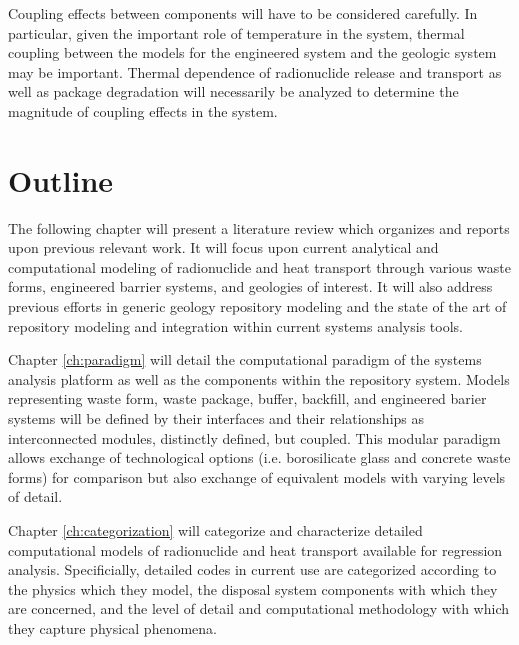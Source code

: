 Coupling effects between components will have to be considered 
carefully.  In particular, given the important role of temperature in 
the system, thermal coupling between the models for the engineered 
system and the geologic system may be important. Thermal dependence of 
radionuclide release and transport as well as package degradation will 
necessarily be analyzed to determine the magnitude of coupling effects 
in the system.


\section{Outline}

The following chapter will present a literature review which organizes 
and reports upon previous relevant work. It will focus upon current 
analytical and computational modeling of radionuclide and heat transport 
through various waste forms, engineered barrier systems, and geologies 
of interest. It will also address previous efforts in generic geology 
repository modeling and the state of the art of repository modeling 
and integration within current systems analysis tools. 

Chapter \ref{ch:paradigm} will detail the computational paradigm of 
the \Cyclus systems analysis platform as well as the components within 
the repository system. Models
representing waste form, waste package, buffer, backfill, and 
engineered barier systems will be defined by their interfaces and 
their relationships as interconnected modules, distinctly defined, but 
coupled. This modular paradigm allows exchange  of technological 
options (i.e. borosilicate glass and concrete waste forms) for 
comparison but also exchange of equivalent models with varying levels 
of detail.


Chapter \ref{ch:categorization} will categorize and characterize 
detailed computational models of radionuclide and heat transport available 
for regression analysis. Specificially, detailed codes in current use 
are categorized according to the physics which they model, the 
disposal system components with which they are concerned, and the 
level of detail and computational methodology with which they capture 
physical phenomena. 


